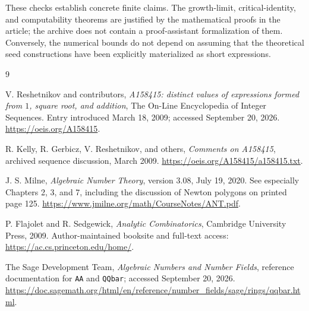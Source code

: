 \documentclass[11pt,letterpaper]{article}
\numberwithin{equation}{section}
\theoremstyle{definition}
\begin{document}
These checks establish concrete finite claims. The growth-limit,
critical-identity, and computability theorems are justified by the mathematical
proofs in the article; the archive does not contain a proof-assistant
formalization of them. Conversely, the numerical bounds do not depend on
assuming that the theoretical seed constructions have been explicitly
materialized as short expressions.

\begin{thebibliography}{9}

V. Reshetnikov and contributors,
\emph{A158415: distinct values of expressions formed from $1$, square root,
and addition}, The On-Line Encyclopedia of Integer Sequences.
Entry introduced March 18, 2009; accessed September 20, 2026.
\url{https://oeis.org/A158415}.

R. Kelly, R. Gerbicz, V. Reshetnikov, and others,
\emph{Comments on A158415}, archived sequence discussion, March 2009.
\url{https://oeis.org/A158415/a158415.txt}.

J. S. Milne,
\emph{Algebraic Number Theory}, version 3.08, July 19, 2020.
See especially Chapters 2, 3, and 7, including the discussion of Newton
polygons on printed page 125.
\url{https://www.jmilne.org/math/CourseNotes/ANT.pdf}.

P. Flajolet and R. Sedgewick,
\emph{Analytic Combinatorics}, Cambridge University Press, 2009.
Author-maintained booksite and full-text access:
\url{https://ac.cs.princeton.edu/home/}.

The Sage Development Team,
\emph{Algebraic Numbers and Number Fields}, reference documentation for
\texttt{AA} and \texttt{QQbar}; accessed September 20, 2026.
\url{https://doc.sagemath.org/html/en/reference/number_fields/sage/rings/qqbar.html}.

\end{thebibliography}
\end{document}
